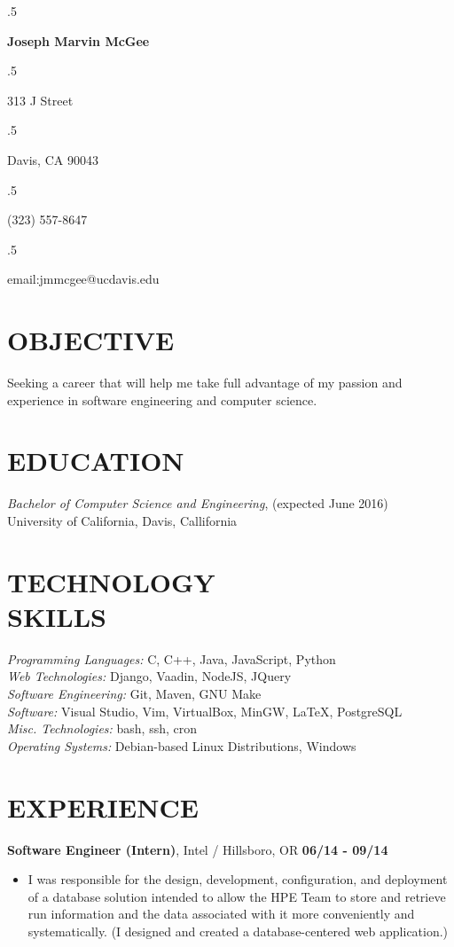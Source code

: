 \documentclass[line, margin, 10pt]{res} %
\begin{document}
\moveleft.5\hoffset\centerline{\large\bf Joseph Marvin McGee} %
\moveleft.5\hoffset\centerline{313 J Street} %
\moveleft.5\hoffset\centerline{Davis, CA 90043}
\moveleft.5\hoffset\centerline{(323) 557-8647}
\moveleft.5\hoffset\centerline{email:jmmcgee@ucdavis.edu}

\begin{resume}


\section{OBJECTIVE}
    Seeking a career that will help me take full advantage of my passion and experience in software engineering and computer science. 

\section{EDUCATION}
    {\sl Bachelor of Computer Science and Engineering}, (expected June 2016) \\University of California, Davis, Callifornia

\section{TECHNOLOGY \\ SKILLS} 
    {\sl Programming Languages:}  C, C++, Java, JavaScript, Python \\
    {\sl Web Technologies:} Django, Vaadin, NodeJS, JQuery \\
    {\sl Software Engineering:} Git, Maven, GNU Make \\
    {\sl Software:} Visual Studio, Vim, VirtualBox, MinGW, LaTeX, PostgreSQL \\
    {\sl Misc. Technologies:} bash, ssh, cron \\
    {\sl Operating Systems:} Debian-based Linux Distributions, Windows

\section{EXPERIENCE}
 {\bf Software Engineer (Intern)}, Intel / Hillsboro, OR
 \hfill {\bf 06/14 - 09/14}
 \begin{itemize}[noitemsep,nolistsep] \itemsep -2pt
     \item I was responsible for the design, development, configuration, and deployment of a database solution intended to allow the HPE Team to store and retrieve run information and the data associated with it more conveniently and systematically. (I designed and created a database-centered web application.)
 \end{itemize}


\end{resume}
\end{document}
